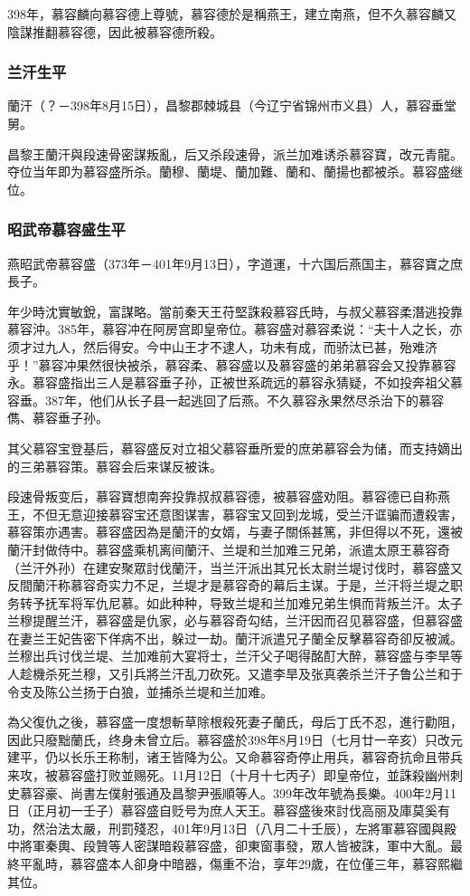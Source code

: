 398年，慕容麟向慕容德上尊號，慕容德於是稱燕王，建立南燕，但不久慕容麟又陰謀推翻慕容德，因此被慕容德所殺。

\subsubsection{兰汗生平}

蘭汗（？－398年8月15日），昌黎郡棘城县（今辽宁省锦州市义县）人，慕容垂堂舅。

昌黎王蘭汗與段速骨密謀叛亂，后又杀段速骨，派兰加难诱杀慕容寶，改元青龍。夺位当年即为慕容盛所杀。蘭穆、蘭堤、蘭加難、蘭和、蘭揚也都被杀。慕容盛继位。

\subsubsection{昭武帝慕容盛生平}

燕昭武帝慕容盛（373年－401年9月13日），字道運，十六国后燕国主，慕容寶之庶長子。

年少時沈實敏銳，富謀略。當前秦天王苻堅誅殺慕容氏時，与叔父慕容柔潛逃投靠慕容沖。385年，慕容冲在阿房宫即皇帝位。慕容盛对慕容柔说：“夫十人之长，亦须才过九人，然后得安。今中山王才不逮人，功未有成，而骄汰已甚，殆难济乎！”慕容冲果然很快被杀，慕容柔、慕容盛以及慕容盛的弟弟慕容会又投靠慕容永。慕容盛指出三人是慕容垂子孙，正被世系疏远的慕容永猜疑，不如投奔祖父慕容垂。387年，他们从长子县一起逃回了后燕。不久慕容永果然尽杀治下的慕容儁、慕容垂子孙。

其父慕容宝登基后，慕容盛反对立祖父慕容垂所爱的庶弟慕容会为储，而支持嫡出的三弟慕容策。慕容会后来谋反被诛。

段速骨叛变后，慕容寶想南奔投靠叔叔慕容德，被慕容盛劝阻。慕容德已自称燕王，不但无意迎接慕容宝还意图谋害，慕容宝又回到龙城，受兰汗诓骗而遭殺害，慕容策亦遇害。慕容盛因為是蘭汗的女婿，与妻子關係甚篤，非但得以不死，還被蘭汗封做侍中。慕容盛乘机离间蘭汗、兰堤和兰加难三兄弟，派遣太原王慕容奇（兰汗外孙）在建安聚眾討伐蘭汗，当兰汗派出其兄长太尉兰堤讨伐时，慕容盛又反間蘭汗称慕容奇实力不足，兰堤才是慕容奇的幕后主谋。于是，兰汗将兰堤之职务转予抚军将军仇尼慕。如此种种，导致兰堤和兰加难兄弟生惧而背叛兰汗。太子兰穆提醒兰汗，慕容盛是仇家，必与慕容奇勾结，兰汗因而召见慕容盛，但慕容盛在妻兰王妃告密下佯病不出，躲过一劫。蘭汗派遣兄子蘭全反擊慕容奇卻反被滅。兰穆出兵讨伐兰堤、兰加难前大宴将士，兰汗父子喝得酩酊大醉，慕容盛与李旱等人趁機杀死兰穆，又引兵將兰汗乱刀砍死。又遣李旱及张真袭杀兰汗子鲁公兰和于令支及陈公兰扬于白狼，並捕杀兰堤和兰加难。

為父復仇之後，慕容盛一度想斬草除根殺死妻子蘭氏，母后丁氏不忍，進行勸阻，因此只廢黜蘭氏，终身未曾立后。慕容盛於398年8月19日（七月廿一辛亥）只改元建平，仍以长乐王称制，诸王皆降为公。又命慕容奇停止用兵，慕容奇抗命且带兵来攻，被慕容盛打败並赐死。11月12日（十月十七丙子）即皇帝位，並誅殺幽州刺史慕容豪、尚書左僕射張通及昌黎尹張順等人。399年改年號為長樂。400年2月11日（正月初一壬子）慕容盛自贬号为庶人天王。慕容盛後來討伐高丽及庫莫奚有功，然治法太嚴，刑罰殘忍，401年9月13日（八月二十壬辰），左將軍慕容國與殿中將軍秦輿、段贊等人密謀暗殺慕容盛，卻東窗事發，眾人皆被誅，軍中大亂。最終平亂時，慕容盛本人卻身中暗器，傷重不治，享年29歲，在位僅三年，慕容熙繼其位。


